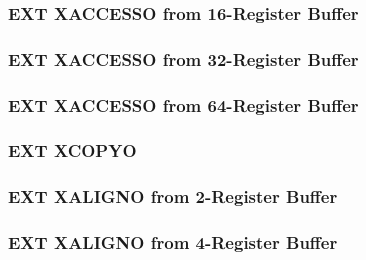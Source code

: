 \subsubsection[{\small EXT XACCESSO from 16-Register Buffer}]{EXT XACCESSO from 16-Register Buffer} \label{sec:format-EXT-XACCESSO16}



\subsubsection[{\small EXT XACCESSO from 32-Register Buffer}]{EXT XACCESSO from 32-Register Buffer} \label{sec:format-EXT-XACCESSO32}



\subsubsection[{\small EXT XACCESSO from 64-Register Buffer}]{EXT XACCESSO from 64-Register Buffer} \label{sec:format-EXT-XACCESSO64}



\subsubsection[{\small EXT XCOPYO}]{EXT XCOPYO} \label{sec:format-EXT-XCOPYO}



\subsubsection[{\small EXT XALIGNO from 2-Register Buffer}]{EXT XALIGNO from 2-Register Buffer} \label{sec:format-EXT-XALIGNO2}



\subsubsection[{\small EXT XALIGNO from 4-Register Buffer}]{EXT XALIGNO from 4-Register Buffer} \label{sec:format-EXT-XALIGNO4}

